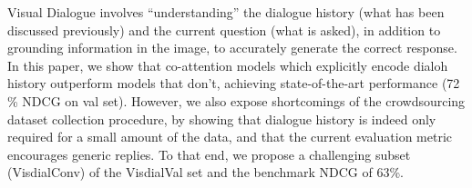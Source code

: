 Visual Dialogue involves ``understanding'' the dialogue history (what has been discussed previously) and the current question (what is asked), in addition to grounding information in the image, to accurately generate the correct response. In this paper, we show that co-attention models which explicitly encode dialoh history outperform models that don't, achieving state-of-the-art performance (72 \% NDCG on val set). However, we also expose shortcomings of the crowdsourcing dataset collection procedure, by showing that dialogue history is indeed only required for a small amount of the data, and that the current evaluation metric encourages generic replies. To that end, we propose a challenging subset (VisdialConv) of the VisdialVal set and the benchmark NDCG of 63\%.
